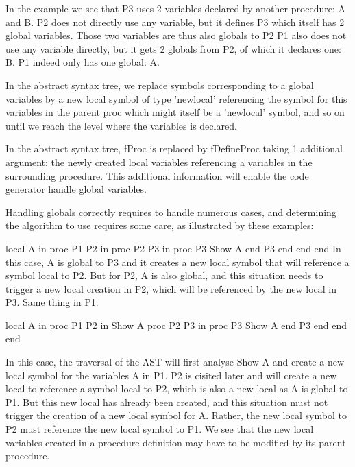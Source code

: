 \documentclass[draft,a4paper]{memoir}
\begin{document}
In the example we see that P3 uses 2 variables declared by another procedure: A and B. 
P2 does not directly use any variable, but it defines P3 which itself has 2 global variables. Those two variables are thus also globals to P2
P1 also does not use any variable directly, but it gets 2 globals from P2, of which it declares one: B. P1 indeed only has one global: A.

In the abstract syntax tree, we replace symbols corresponding to a global variables by a new local symbol of type 'newlocal' referencing the symbol for this variables in the parent proc which might itself be a 'newlocal' symbol, and so on until we reach the level where the variables is declared.

In the abstract syntax tree, fProc is replaced by fDefineProc taking 1 additional argument: the newly created local variables referencing a variables in the surrounding procedure. This additional information will enable the code generator handle global variables.

Handling globals correctly requires to handle numerous cases, and determining the algorithm to use requires some care, as illustrated by these examples:

local
   A
in
   proc {P1}
      P2
   in
      proc {P2}
         P3
      in
         proc {P3}
            {Show A}
         end
         {P3}
      end
   end
end
In this case, A is global to P3 and it creates a new local symbol that will reference a symbol local to P2. But for P2, A is also global, and this situation needs to trigger a new local creation in P2, which will be referenced by the new local in P3. Same thing in P1.

local
   A
in
   proc {P1}
      P2
   in
      {Show A}  %
      proc {P2}
         P3
      in
         proc {P3}
            {Show A}
         end
         {P3}
      end
   end
end

In this case, the traversal of the AST will first analyse {Show A} and create a new local symbol for the variables A in P1. P2 is cisited later and will create a new local to reference a symbol local to P2, which is also a new local as A is global to P1. But this new local has already been created, and this situation must not trigger the creation of a new local symbol for A. Rather, the new local symbol to P2 must reference the new local symbol to P1. We see that the new local variables created in a procedure definition may have to be modified by its parent procedure.
\end{document}
